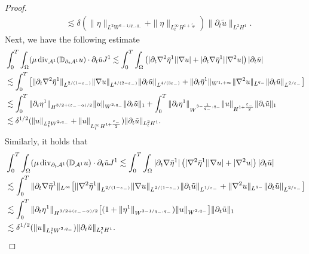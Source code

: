 \documentclass[letterpaper,reqno,10pt,twoside]{amsart}
\theoremstyle{definition}
\theoremstyle{remark}
\def\p{\partial}
\def\Om{\Omega}
\def\dive{\mathop{\rm div}\nolimits}
\begin{document}
\begin{proof}
\begin{equation}
\begin{aligned}
					&\lesssim\delta(\|\eta\|_{L^2W^{3-1/q_-,q_-}}+\|\eta\|_{L_{t}^{\infty}H^{1+\frac{\varepsilon_{-}}{2}}})\|\p_t\tilde{u}\|_{L^2H^1}.
				\end{aligned}
			\end{equation}
			Next, we have the following estimate
			\begin{equation}\label{est:remain_bulk22}
				\begin{aligned}
					&\int_0^T\int_\Om (\mu\dive_{\mathcal{A}^1}(\mathbb{D}_{\p_{t}\mathcal{A}^1}{u})\cdot\p_t\tilde{u}J^1\lesssim\int_0^T\int_\Om \left(|\p_{t}\nabla^2\bar{\eta}^1||\nabla{u}|+|\p_{t}\nabla \bar{\eta}^{1}||\nabla^2{u}|\right)|\p_t\tilde{u}|\\
					&\lesssim\int_0^T\big[\|\p_{t}\nabla^2\bar{\eta}^1\|_{L^{2/(1-\varepsilon_-)}}\|\nabla {u}\|_{L^{4/(2-\varepsilon_-)}}\|\p_t\tilde{u}\|_{L^{4/(3\varepsilon_-)}}+\|\p_{t}\bar{\eta}^{1}\|_{W^{1,+\infty}}\|\nabla^2{u}\|_{L^{q_-}}\|\p_t\tilde{u}\|_{L^{2/\varepsilon_-}}\big]\\
					&\lesssim\int_0^T\|\p_t\eta^1\|_{H^{3/2+(\varepsilon_--\alpha)/2}}\|{u}\|_{W^{2,q_-}}\|\p_t\tilde{u}\|_{1}+\int_{0}^{T}\|\p_{t}\eta^{1}\|_{W^{3-\frac{1}{q_{-}},q_-}}\|u\|_{H^{1+\frac{\varepsilon_{-}}{2}}}\|\p_{t}\tilde{u}\|_{1}\\
					&\lesssim\delta^{1/2}(\|{u}\|_{L_{t}^2W^{2,q_-}}+\|u\|_{L_{t}^{\infty}H^{1+\frac{\varepsilon_{-}}{2}}})\|\p_t\tilde{u}\|_{L_{t}^2H^1}.
				\end{aligned}
			\end{equation}
			Similarly, it holds that
			\begin{align}
				\begin{aligned}
					&\int_0^T\int_\Om (\mu\dive_{\p_{t}\mathcal{A}^1}(\mathbb{D}_{\mathcal{A}^1}{u})\cdot\p_t\tilde{u}J^1\lesssim\int_0^T\int_\Om |\p_{t}\nabla\bar{\eta}^{1}|\left(|\nabla^2\bar{\eta}^1||\nabla{u}|+|\nabla^2{u}|\right)|\p_t\tilde{u}|\\
					&\lesssim\int_0^T\|\p_{t}\nabla \bar{\eta}^{1}\|_{L^{\infty}}\big[\|\nabla^2\bar{\eta}^1\|_{L^{2/(1-\varepsilon_-)}}\|\nabla {u}\|_{L^{2/(1-\varepsilon_-)}}\|\p_t\tilde{u}\|_{L^{1/\varepsilon_-}}+\|\nabla^2{u}\|_{L^{q_-}}\|\p_t\tilde{u}\|_{L^{2/\varepsilon_-}}\big]\\
					&\lesssim\int_0^T\|\p_t\eta^1\|_{H^{3/2+(\varepsilon_--\alpha)/2}}\big[(1+\|\eta^1\|_{W^{3-1/q_-,q_-}})\|{u}\|_{W^{2,q_-}}\big]\|\p_t\tilde{u}\|_{1}\\
					&\lesssim\delta^{1/2}(\|{u}\|_{L_{t}^2W^{2,q_-}})\|\p_t\tilde{u}\|_{L_{t}^2H^1}.
				\end{aligned}

\end{align}
\end{proof}
\end{document}
